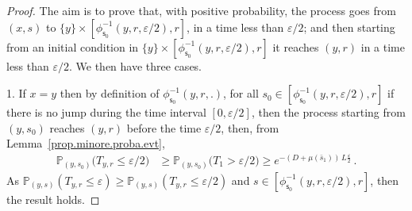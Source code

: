\documentclass[AHL,Unicode,longabstracts,published]{cedram}
\newcommand{\PP}{\mathbb{P}}
\newcommand{\barmu}{\mu(\bar s_1)}
\newcommand{\phis}{\phi_{\textsf{s}_0}^{-1}}
\newcommand{\1}{\mathbf{1}}
\begin{document}
\begin{proof}
The aim is to prove that, with positive probability, the process goes from $(x,s)$ to $\{y\}\times [\phis(y,r,\varepsilon/2), r]$, in a time less than $\varepsilon/2$; and then starting from an initial condition in $\{y\}\times [\phis(y,r,\varepsilon/2), r]$ it reaches $(y,r)$ in a time less than $\varepsilon/2$. We then have three cases.

1. If $x=y$ then by definition of $\phis(y,r,.)$, for all $s_0 \in [\phis(y,r, \varepsilon/2), r]$ if there is no jump during the time interval $[0,\varepsilon/2]$, then the process starting from $(y,s_0)$ reaches $(y,r)$ before the time $\varepsilon/2$, then, from Lemma~\ref{prop.minore.proba.evt},
\begin{align}\label{eq.reach.Tys.fromSandy}
\PP_{\left(y,s_0\right)}
\Big(T_{y,r} \leq \varepsilon/2 \Big) &\geq
\PP_{(y,s_0)}
\Big(T_1>\varepsilon/2\Big)
\geq
e^{-(D+\barmu)\,L\frac{\varepsilon}{2}}\,.
\end{align}
As $\PP_{(y,s)}
(T_{y,r} \leq \varepsilon ) \geq \PP_{(y,s)}
(T_{y,r} \leq \varepsilon/2 )$ and $s \in [\phis(y,r, \varepsilon/2),r]$, then the result holds.



\end{proof}
\end{document}
